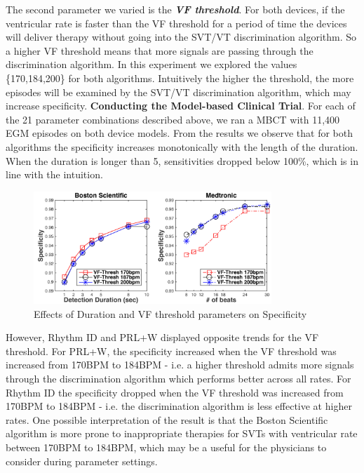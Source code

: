 The second parameter we varied is the \emph{\textbf{VF threshold}}.
For both devices, if the ventricular rate is faster than the VF threshold for a period of time the devices will deliver therapy without going into the SVT/VT discrimination algorithm. So a higher VF threshold means that more signals are passing through the discrimination algorithm.
In this experiment we explored the values \{170,184,200\} for both algorithms.
Intuitively the higher the threshold, the more episodes will be examined by the SVT/VT discrimination algorithm, which may increase specificity.
\newline\textbf{Conducting the Model-based Clinical Trial}. 
For each of the 21 parameter combinations described above, we ran a MBCT with 11,400 EGM episodes on both device models. 
From the results we observe that for both algorithms the specificity increases monotonically with the length of the duration.
When the duration is longer than 5, sensitivities dropped below 100\%, which is in line with the intuition.
\begin{figure}[t]
	
		\centering
		\includegraphics[width=0.8\textwidth]{figs/parameter.pdf}
		\caption{\small Effects of Duration and VF threshold parameters on Specificity}
		\label{fig:parameter}
\end{figure}
However, Rhythm ID and PRL+W displayed opposite trends for the VF threshold.
For PRL+W, the specificity increased when the VF threshold was increased from 170BPM to 184BPM - i.e. a higher threshold admits more signals through the discrimination algorithm which performs better across all rates.
For Rhythm ID the specificity dropped when the VF threshold was increased from 170BPM to 184BPM - i.e. the discrimination algorithm is less effective at higher rates. 
One possible interpretation of the result is that the Boston Scientific algorithm is more prone to inappropriate therapies for SVTs with ventricular rate between 170BPM to 184BPM, which may be a useful for the physicians to consider during parameter settings. 




